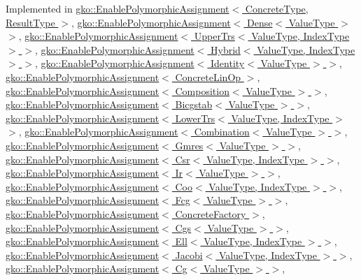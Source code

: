 Implemented in \hyperlink{classgko_1_1EnablePolymorphicAssignment_a0a4cf244139e7761d6a91c61e029810e}{gko\+::\+Enable\+Polymorphic\+Assignment$<$ Concrete\+Type, Result\+Type $>$}, \hyperlink{classgko_1_1EnablePolymorphicAssignment_a0a4cf244139e7761d6a91c61e029810e}{gko\+::\+Enable\+Polymorphic\+Assignment$<$ Dense$<$ Value\+Type $>$ $>$}, \hyperlink{classgko_1_1EnablePolymorphicAssignment_a0a4cf244139e7761d6a91c61e029810e}{gko\+::\+Enable\+Polymorphic\+Assignment$<$ Upper\+Trs$<$ Value\+Type, Index\+Type $>$ $>$}, \hyperlink{classgko_1_1EnablePolymorphicAssignment_a0a4cf244139e7761d6a91c61e029810e}{gko\+::\+Enable\+Polymorphic\+Assignment$<$ Hybrid$<$ Value\+Type, Index\+Type $>$ $>$}, \hyperlink{classgko_1_1EnablePolymorphicAssignment_a0a4cf244139e7761d6a91c61e029810e}{gko\+::\+Enable\+Polymorphic\+Assignment$<$ Identity$<$ Value\+Type $>$ $>$}, \hyperlink{classgko_1_1EnablePolymorphicAssignment_a0a4cf244139e7761d6a91c61e029810e}{gko\+::\+Enable\+Polymorphic\+Assignment$<$ Concrete\+Lin\+Op $>$}, \hyperlink{classgko_1_1EnablePolymorphicAssignment_a0a4cf244139e7761d6a91c61e029810e}{gko\+::\+Enable\+Polymorphic\+Assignment$<$ Composition$<$ Value\+Type $>$ $>$}, \hyperlink{classgko_1_1EnablePolymorphicAssignment_a0a4cf244139e7761d6a91c61e029810e}{gko\+::\+Enable\+Polymorphic\+Assignment$<$ Bicgstab$<$ Value\+Type $>$ $>$}, \hyperlink{classgko_1_1EnablePolymorphicAssignment_a0a4cf244139e7761d6a91c61e029810e}{gko\+::\+Enable\+Polymorphic\+Assignment$<$ Lower\+Trs$<$ Value\+Type, Index\+Type $>$ $>$}, \hyperlink{classgko_1_1EnablePolymorphicAssignment_a0a4cf244139e7761d6a91c61e029810e}{gko\+::\+Enable\+Polymorphic\+Assignment$<$ Combination$<$ Value\+Type $>$ $>$}, \hyperlink{classgko_1_1EnablePolymorphicAssignment_a0a4cf244139e7761d6a91c61e029810e}{gko\+::\+Enable\+Polymorphic\+Assignment$<$ Gmres$<$ Value\+Type $>$ $>$}, \hyperlink{classgko_1_1EnablePolymorphicAssignment_a0a4cf244139e7761d6a91c61e029810e}{gko\+::\+Enable\+Polymorphic\+Assignment$<$ Csr$<$ Value\+Type, Index\+Type $>$ $>$}, \hyperlink{classgko_1_1EnablePolymorphicAssignment_a0a4cf244139e7761d6a91c61e029810e}{gko\+::\+Enable\+Polymorphic\+Assignment$<$ Ir$<$ Value\+Type $>$ $>$}, \hyperlink{classgko_1_1EnablePolymorphicAssignment_a0a4cf244139e7761d6a91c61e029810e}{gko\+::\+Enable\+Polymorphic\+Assignment$<$ Coo$<$ Value\+Type, Index\+Type $>$ $>$}, \hyperlink{classgko_1_1EnablePolymorphicAssignment_a0a4cf244139e7761d6a91c61e029810e}{gko\+::\+Enable\+Polymorphic\+Assignment$<$ Fcg$<$ Value\+Type $>$ $>$}, \hyperlink{classgko_1_1EnablePolymorphicAssignment_a0a4cf244139e7761d6a91c61e029810e}{gko\+::\+Enable\+Polymorphic\+Assignment$<$ Concrete\+Factory $>$}, \hyperlink{classgko_1_1EnablePolymorphicAssignment_a0a4cf244139e7761d6a91c61e029810e}{gko\+::\+Enable\+Polymorphic\+Assignment$<$ Cgs$<$ Value\+Type $>$ $>$}, \hyperlink{classgko_1_1EnablePolymorphicAssignment_a0a4cf244139e7761d6a91c61e029810e}{gko\+::\+Enable\+Polymorphic\+Assignment$<$ Ell$<$ Value\+Type, Index\+Type $>$ $>$}, \hyperlink{classgko_1_1EnablePolymorphicAssignment_a0a4cf244139e7761d6a91c61e029810e}{gko\+::\+Enable\+Polymorphic\+Assignment$<$ Jacobi$<$ Value\+Type, Index\+Type $>$ $>$}, \hyperlink{classgko_1_1EnablePolymorphicAssignment_a0a4cf244139e7761d6a91c61e029810e}{gko\+::\+Enable\+Polymorphic\+Assignment$<$ Cg$<$ Value\+Type $>$ $>$}, 
